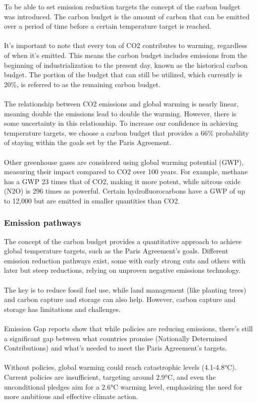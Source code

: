 \documentclass[../summary.tex]{subfiles}
\begin{document}
To be able to set emission reduction targets the concept of the carbon budget was introduced. The carbon budget is the amount of carbon that can be emitted over a period of time before a certain temperature target is reached.\\
\\
It's important to note that every ton of CO2 contributes to warming, regardless of when it's emitted. This means the carbon budget includes emissions from the beginning of industrialization to the present day, known as the historical carbon budget. The portion of the budget that can still be utilized, which currently is 20\%, is referred to as the remaining carbon budget.\\
\\
The relationship between CO2 emissions and global warming is nearly linear, meaning double the emissions lead to double the warming. However, there is some uncertainty in this relationship. To increase our confidence in achieving temperature targets, we choose a carbon budget that provides a 66\% probability of staying within the goals set by the Paris Agreement.\\
\\
Other greenhouse gases are considered using global warming potential (GWP), measuring their impact compared to CO2 over 100 years. For example, methane has a GWP 23 times that of CO2, making it more potent, while nitrous oxide (N2O) is 296 times as powerful. Certain hydrofluorocarbons have a GWP of up to 12,000 but are emitted in smaller quantities than CO2.

\subsubsection{Emission pathways}

The concept of the carbon budget provides a quantitative approach to achieve global temperature targets, such as the Paris Agreement's goals. Different emission reduction pathways exist, some with early strong cuts and others with later but steep reductions, relying on unproven negative emissions technology.\\
\\
The key is to reduce fossil fuel use, while land management (like planting trees) and carbon capture and storage can also help. However, carbon capture and storage has limitations and challenges.\\
\\
Emission Gap reports show that while policies are reducing emissions, there's still a significant gap between what countries promise (Nationally Determined Contributions) and what's needed to meet the Paris Agreement's targets.\\
\\
Without policies, global warming could reach catastrophic levels (4.1-4.8°C). Current policies are insufficient, targeting around 2.9°C, and even the unconditional pledges aim for a 2.6°C warming level, emphasizing the need for more ambitious and effective climate action.
\newpage
\end{document}
